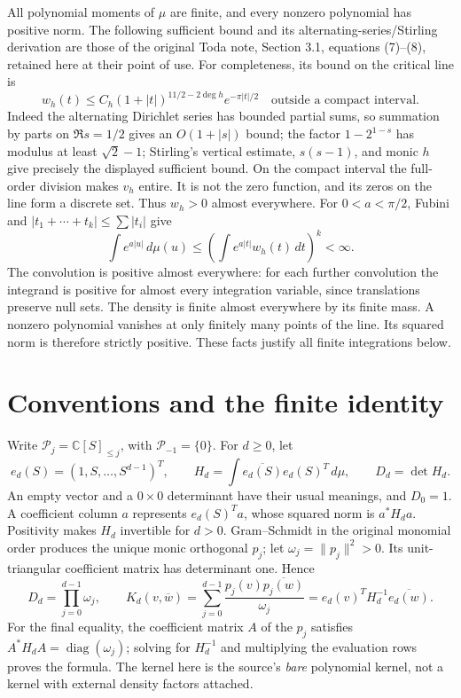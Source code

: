 \documentclass[11pt]{article}
\newcommand{\C}{\mathbb C}
\newcommand{\Pp}{\mathcal P}
\begin{document}
All polynomial moments of \(\mu\) are finite, and every nonzero
polynomial has positive norm. The following sufficient bound and its
alternating-series/Stirling derivation are those of the original Toda
note, Section 3.1, equations (7)--(8), retained here at their point of
use. For completeness, its bound on the critical line is
\[
 w_h(t)\leq C_h(1+|t|)^{11/2-2\deg h}e^{-\pi|t|/2}
 \quad\text{outside a compact interval}.
\]
Indeed the alternating Dirichlet series has bounded partial sums, so
summation by parts on \(\Re s=1/2\) gives an \(O(1+|s|)\) bound; the
factor \(1-2^{1-s}\) has modulus at least \(\sqrt2-1\); Stirling's
vertical estimate, \(s(s-1)\), and monic \(h\) give precisely the
displayed sufficient bound. On the compact interval the full-order
division makes \(v_h\) entire. It is not the zero function, and its
zeros on the line form a discrete set. Thus \(w_h>0\) almost everywhere.
For \(0<a<\pi/2\), Fubini and \(|t_1+\cdots+t_k|\leq\sum|t_i|\) give
\[
 \int e^{a|u|}\,d\mu(u)
 \leq\left(\int e^{a|t|}w_h(t)\,dt\right)^k<\infty.
\]
The convolution is positive almost everywhere: for each further
convolution the integrand is positive for almost every integration
variable, since translations preserve null sets. The density is finite
almost everywhere by its finite mass. A nonzero polynomial vanishes at
only finitely many points of the line. Its squared norm is therefore
strictly positive. These facts justify all finite integrations below.

\section{Conventions and the finite identity}\label{sec:statement}

Write \(\Pp_j=\C[S]_{\leq j}\), with \(\Pp_{-1}=\{0\}\).
For \(d\geq0\), let
\[
 e_d(S)=(1,S,\ldots,S^{d-1})^T,\qquad
 H_d=\int\overline{e_d(S)}e_d(S)^T\,d\mu,
 \qquad D_d=\det H_d.
\]
An empty vector and a \(0\times0\) determinant have their usual meanings,
and \(D_0=1\). A coefficient column \(a\) represents \(e_d(S)^Ta\),
whose squared norm is \(a^*H_da\). Positivity makes \(H_d\) invertible
for \(d>0\). Gram--Schmidt in the original monomial order produces the
unique monic orthogonal \(p_j\); let \(\omega_j=\|p_j\|^2>0\). Its
unit-triangular coefficient matrix has determinant one. Hence
\begin{equation}\label{eq:kernel}
 D_d=\prod_{j=0}^{d-1}\omega_j,
 \qquad
 K_d(v,\overline w)=\sum_{j=0}^{d-1}
      \frac{p_j(v)\overline{p_j(w)}}{\omega_j}
   =e_d(v)^TH_d^{-1}\overline{e_d(w)}.
\end{equation}
For the final equality, the coefficient matrix \(A\) of the \(p_j\)
satisfies \(A^*H_dA=\operatorname{diag}(\omega_j)\); solving for
\(H_d^{-1}\) and multiplying the evaluation rows proves the formula.
The kernel here is the source's \emph{bare} polynomial kernel, not a
kernel with external density factors attached.
\end{document}
